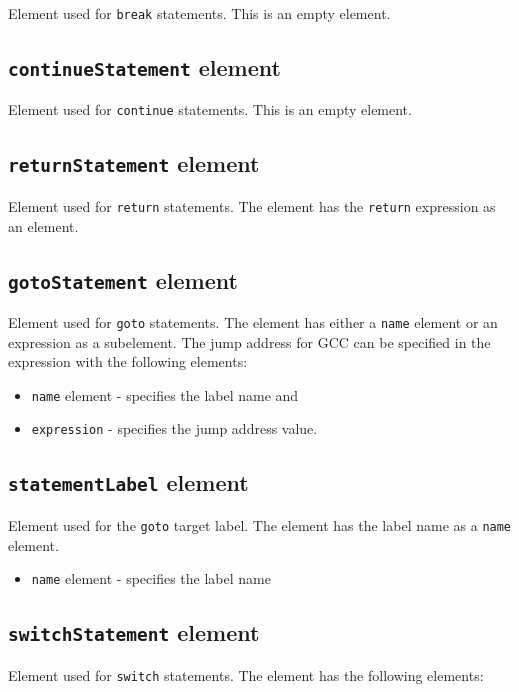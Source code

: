 Element used for {\tt break} statements. This is an empty element.


\subsection{ {\tt continueStatement} element}

Element used for {\tt continue} statements. This is an empty element.


\subsection{ {\tt returnStatement} element}

Element used for {\tt return} statements. The element has the {\tt return} expression as an element.


\subsection{ {\tt gotoStatement} element}

Element used for {\tt goto} statements. The element has either a {\tt name} element or an expression as a subelement. The jump address for GCC can be specified in the expression with the following elements:

\begin{itemize}
\item {\tt name} element - specifies the label name and
\item {\tt expression} - specifies the jump address value.
\end{itemize}


\subsection{ {\tt statementLabel} element}

Element used for the {\tt goto} target label. The element has the label name as a {\tt name} element.

\begin{itemize}
\item {\tt name} element - specifies the label name
\end{itemize}


\subsection{ {\tt switchStatement} element}

Element used for {\tt switch} statements. The element has the following elements:

